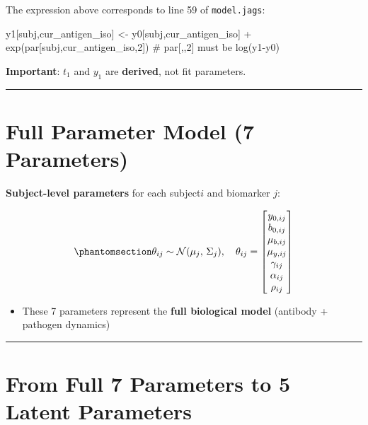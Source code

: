\documentclass[
]{article}
\newenvironment{Shaded}{\begin{snugshade}}{\end{snugshade}}
\newcommand{\CommentTok}[1]{\textcolor[rgb]{0.37,0.37,0.37}{#1}}
\newcommand{\DecValTok}[1]{\textcolor[rgb]{0.68,0.00,0.00}{#1}}
\newcommand{\FunctionTok}[1]{\textcolor[rgb]{0.28,0.35,0.67}{#1}}
\newcommand{\NormalTok}[1]{\textcolor[rgb]{0.00,0.23,0.31}{#1}}
\newcommand{\OtherTok}[1]{\textcolor[rgb]{0.00,0.23,0.31}{#1}}
\newcommand{\SpecialCharTok}[1]{\textcolor[rgb]{0.37,0.37,0.37}{#1}}
\providecommand{\tightlist}{%
  \setlength{\itemsep}{0pt}\setlength{\parskip}{0pt}}\usepackage{longtable,booktabs,array}
\begin{document}
The expression above corresponds to line 59 of \texttt{model.jags}:

\begin{Shaded}
\begin{Highlighting}[numbers=left,,firstnumber=59,]
\NormalTok{   y1[subj,cur\_antigen\_iso]    }\OtherTok{\textless{}{-}}\NormalTok{ y0[subj,cur\_antigen\_iso] }\SpecialCharTok{+} \FunctionTok{exp}\NormalTok{(par[subj,cur\_antigen\_iso,}\DecValTok{2}\NormalTok{]) }\CommentTok{\# par[,,2] must be log(y1{-}y0)}
\end{Highlighting}
\end{Shaded}

\textbf{Important}: \(t_1\) and \(y_1\) are \textbf{derived}, not fit
parameters.

\begin{center}\rule{0.5\linewidth}{0.5pt}\end{center}

\section{Full Parameter Model (7
Parameters)}\label{full-parameter-model-7-parameters}

\textbf{Subject-level parameters} for each subject\(i\) and biomarker
\(j\):

\begin{equation}\phantomsection\label{eq-9}{
\theta_{ij} \sim \mathcal{N}(\mu_j,\, \Sigma_j), \quad \theta_{ij} =
\begin{bmatrix}
y_{0,ij} \\
b_{0,ij} \\
\mu_{b,ij} \\
\mu_{y,ij} \\
\gamma_{ij} \\
\alpha_{ij} \\
\rho_{ij}
\end{bmatrix}
}\end{equation}

\begin{itemize}
\tightlist
\item
  These 7 parameters represent the \textbf{full biological model}
  (antibody + pathogen dynamics)
\end{itemize}

\begin{center}\rule{0.5\linewidth}{0.5pt}\end{center}

\section{From Full 7 Parameters to 5 Latent
Parameters}\label{from-full-7-parameters-to-5-latent-parameters}
\end{document}
